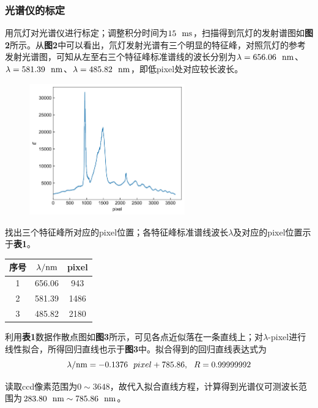 \documentclass[12pt]{article}
\begin{document}
 \subsubsection{光谱仪的标定}
 用氘灯对光谱仪进行标定；调整积分时间为$15\ \ {\rm ms}$，扫描得到氘灯的发射谱图如\textbf{图2}所示。从\textbf{图2}中可以看出，氘灯发射光谱有三个明显的特征峰，对照氘灯的参考发射光谱图，可知从左至右三个特征峰标准谱线的波长分别为$\lambda=656.06\ \ {\rm nm}$、$\lambda=581.39\ \ {\rm nm}$、$\lambda=485.82\ \ {\rm nm}$，即低pixel处对应较长波长。
  \begin{figure}[h]
 	\centering
 	\includegraphics[width=0.6\textwidth]{2.jpg}
 \end{figure}
\par
找出三个特征峰所对应的pixel位置；各特征峰标准谱线波长$\lambda$及对应的pixel位置示于\textbf{表1}。
\begin{table}[h]
	\centering
	\begin{tabular}{ccc}
		\toprule
		序号 & $\lambda/{\rm nm}$ & pixel  \\
		\midrule
		1 & 656.06 & 943 \\
		2 & 581.39 & 1486 \\
		3 & 485.82 & 2180 \\
		\bottomrule
	\end{tabular}
\end{table}
\par
利用\textbf{表1}数据作散点图如\textbf{图3}所示，可见各点近似落在一条直线上；对$\lambda$-pixel进行线性拟合，所得回归直线也示于\textbf{图3}中。拟合得到的回归直线表达式为
$$\lambda / {\rm nm}=-0.1376 \ \ pixel +785.86,\ \ R=0.99999992
$$
\par
读取ccd像素范围为$0\sim3648$，故代入拟合直线方程，计算得到光谱仪可测波长范围为$283.80\ \ {\rm nm} \sim 785.86\ \ {\rm nm}$。
\end{document}
